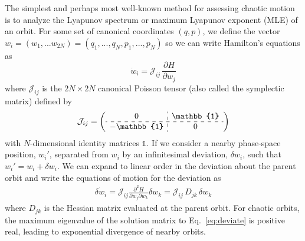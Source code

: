 \documentclass[letterpaper,12pt,preprint]{aastex}
\newcommand{\bs}[1]{\boldsymbol{#1}}
\newcommand{\ident}{\mathbb{1}}
\newcommand{\jac}{\mathscr{J}}
\begin{document}

The simplest and perhaps most well-known method for assessing chaotic motion is to analyze the Lyapunov spectrum or maximum Lyapunov exponent (MLE) of an orbit. For some set of canonical coordinates $(q,p)$, we define the vector $w_i = (w_1,...w_{2N}) = (q_1,...,q_N,p_1,...,p_N)$ so we can write Hamilton's equations as 
\begin{equation}
	\dot{w}_i = \mathcal{J}_{ij}\,\frac{\partial H}{\partial w_j} \label{eq:ham}
\end{equation}
where $\mathcal{J}_{ij}$ is the $2N \times 2N$ canonical Poisson tensor (also called the symplectic matrix) defined by
\begin{equation}
	\mathcal{J}_{ij} = \left( \begin{array}{c:c} 0 & \ident \\ \hdashline -\ident & 0 \end{array} \right)
\end{equation}
with $N$-dimensional identity matrices $\ident$. If we consider a nearby phase-space position, $w_i'$, separated from $w_i$ by an infinitesimal deviation, $\delta w_i$, such that $w_i' = w_i + \delta w_i$. We can expand to linear order in the deviation about the parent orbit and write the equations of motion for the deviation as 
\begin{align}
	\dot{\delta w_i} = \mathcal{J}_{ij} \frac{\partial^2 H}{\partial w_j \partial w_k} \delta w_k =  \mathcal{J}_{ij}\, D_{jk} \, \delta w_k \label{eq:deviate}
\end{align}
where $D_{jk}$ is the Hessian matrix evaluated at the parent orbit. For chaotic orbits, the maximum eigenvalue of the solution matrix to Eq.~\ref{eq:deviate} is positive real, leading to exponential divergence of nearby orbits. 
\end{document}
